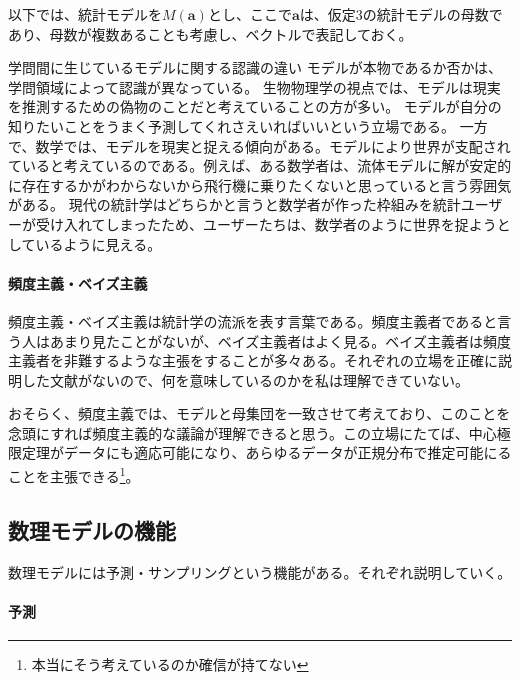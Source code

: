 以下では、統計モデルを$M(\bm{a})$とし、ここで$\bm{a}$は、仮定3の統計モデルの母数であり、母数が複数あることも考慮し、ベクトルで表記しておく。

\begin{SMbox}{学問間に生じているモデルに関する認識の違い}
モデルが本物であるか否かは、学問領域によって認識が異なっている。
生物物理学の視点では、モデルは現実を推測するための偽物のことだと考えていることの方が多い。
モデルが自分の知りたいことをうまく予測してくれさえいればいいという立場である。
一方で、数学では、モデルを現実と捉える傾向がある。モデルにより世界が支配されていると考えているのである。例えば、ある数学者は、流体モデルに解が安定的に存在するかがわからないから飛行機に乗りたくないと思っていると言う雰囲気がある。
現代の統計学はどちらかと言うと数学者が作った枠組みを統計ユーザーが受け入れてしまったため、ユーザーたちは、数学者のように世界を捉ようとしているように見える。
\end{SMbox}


\begin{mybox}
    \paragraph{頻度主義・ベイズ主義}
    頻度主義・ベイズ主義は統計学の流派を表す言葉である。頻度主義者であると言う人はあまり見たことがないが、ベイズ主義者はよく見る。ベイズ主義者は頻度主義者を非難するような主張をすることが多々ある。それぞれの立場を正確に説明した文献がないので、何を意味しているのかを私は理解できていない。

    おそらく、頻度主義では、モデルと母集団を一致させて考えており、このことを念頭にすれば頻度主義的な議論が理解できると思う。この立場にたてば、中心極限定理がデータにも適応可能になり、あらゆるデータが正規分布で推定可能にることを主張できる\footnote{本当にそう考えているのか確信が持てない}。
\end{mybox}
\fi


\begin{brokenbox}[colback=yellow]
    \blindtext[5]
  \end{brokenbox}
\fi 
\subsection{数理モデルの機能}
数理モデルには予測・サンプリングという機能がある。それぞれ説明していく。
\paragraph{予測}

